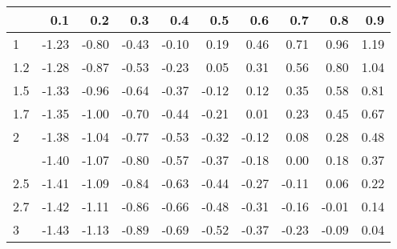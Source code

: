 
\begin{tabular}{lrrrrrrrrr}
\toprule
  & 0.1 & 0.2 & 0.3 & 0.4 & 0.5 & 0.6 & 0.7 & 0.8 & 0.9\\
\midrule
1 & -1.23 & -0.80 & -0.43 & -0.10 & 0.19 & 0.46 & 0.71 & 0.96 & 1.19\\
1.2 & -1.28 & -0.87 & -0.53 & -0.23 & 0.05 & 0.31 & 0.56 & 0.80 & 1.04\\
1.5 & -1.33 & -0.96 & -0.64 & -0.37 & -0.12 & 0.12 & 0.35 & 0.58 & 0.81\\
1.7 & -1.35 & -1.00 & -0.70 & -0.44 & -0.21 & 0.01 & 0.23 & 0.45 & 0.67\\
2 & -1.38 & -1.04 & -0.77 & -0.53 & -0.32 & -0.12 & 0.08 & 0.28 & 0.48\\
\addlinespace
2.2 & -1.40 & -1.07 & -0.80 & -0.57 & -0.37 & -0.18 & 0.00 & 0.18 & 0.37\\
2.5 & -1.41 & -1.09 & -0.84 & -0.63 & -0.44 & -0.27 & -0.11 & 0.06 & 0.22\\
2.7 & -1.42 & -1.11 & -0.86 & -0.66 & -0.48 & -0.31 & -0.16 & -0.01 & 0.14\\
3 & -1.43 & -1.13 & -0.89 & -0.69 & -0.52 & -0.37 & -0.23 & -0.09 & 0.04\\
\bottomrule
\end{tabular}
